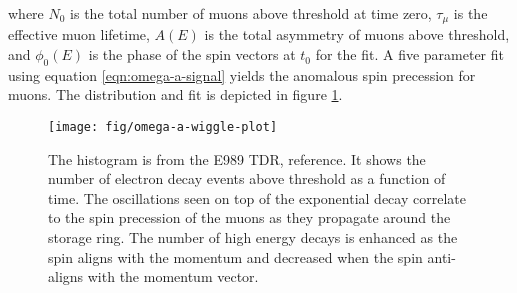 where $N_0$ is the total number of muons above threshold at time zero, $\tau_\mu$ is the effective muon lifetime, $A(E)$ is the total asymmetry of muons above threshold, and $\phi_0(E)$ is the phase of the spin vectors at $t_0$ for the fit.  A five parameter fit using equation \ref{eqn:omega-a-signal} yields the anomalous spin precession for muons.  The distribution and fit is depicted in figure \ref{fig:omega-a-wiggle-plot}.

\begin{figure}
\centering
\texttt{[image: fig/omega-a-wiggle-plot]}
\caption{
    The histogram is from the E989 TDR, reference\cite{e989-tdr}.  It shows the number of electron decay events above threshold as a function of time.  The oscillations seen on top of the exponential decay correlate to the spin precession of the muons as they propagate around the storage ring.  The number of high energy decays is enhanced as the spin aligns with the momentum and decreased when the spin anti-aligns with the momentum vector. 
    \label{fig:omega-a-wiggle-plot}
}
\end{figure}

